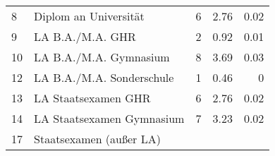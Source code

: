 \begin{longtable}{lXrrr}
     8 &
     \multicolumn{1}{X}{ Diplom an Universität   } &


       \num{6} &
       \num[round-mode=places,round-precision=2]{2.76} &
         \num[round-mode=places,round-precision=2]{0.02} \\

     9 &
     \multicolumn{1}{X}{ LA B.A./M.A. GHR   } &


       \num{2} &
       \num[round-mode=places,round-precision=2]{0.92} &
         \num[round-mode=places,round-precision=2]{0.01} \\

     10 &
     \multicolumn{1}{X}{ LA B.A./M.A. Gymnasium   } &


       \num{8} &
       \num[round-mode=places,round-precision=2]{3.69} &
         \num[round-mode=places,round-precision=2]{0.03} \\

     12 &
     \multicolumn{1}{X}{ LA B.A./M.A. Sonderschule   } &


       \num{1} &
       \num[round-mode=places,round-precision=2]{0.46} &
         \num[round-mode=places,round-precision=2]{0} \\

     13 &
     \multicolumn{1}{X}{ LA Staatsexamen GHR   } &


       \num{6} &
       \num[round-mode=places,round-precision=2]{2.76} &
         \num[round-mode=places,round-precision=2]{0.02} \\

     14 &
     \multicolumn{1}{X}{ LA Staatsexamen Gymnasium   } &


       \num{7} &
       \num[round-mode=places,round-precision=2]{3.23} &
         \num[round-mode=places,round-precision=2]{0.02} \\

     17 &
     \multicolumn{1}{X}{ Staatsexamen (außer LA)   } &



\end{longtable}
